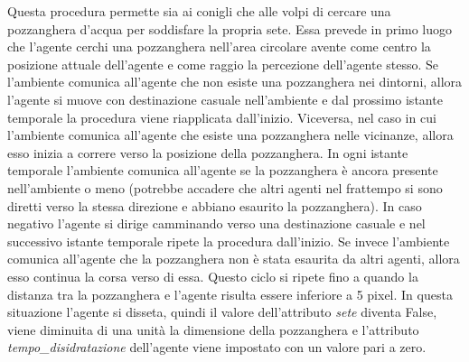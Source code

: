 \documentclass[11pt]{article}
\begin{document}
Questa procedura permette sia ai conigli che alle volpi di cercare una pozzanghera d'acqua per soddisfare la propria sete. Essa prevede in primo luogo che l'agente cerchi una pozzanghera nell'area circolare avente come centro la posizione attuale dell'agente e come raggio la percezione dell'agente stesso. Se l'ambiente comunica all'agente che non esiste una pozzanghera nei dintorni, allora l'agente si muove con destinazione casuale nell'ambiente e dal prossimo istante temporale la procedura viene riapplicata dall'inizio. Viceversa, nel caso in cui l'ambiente comunica all'agente che esiste una pozzanghera nelle vicinanze, allora esso inizia a correre verso la posizione della pozzanghera. In ogni istante temporale l'ambiente comunica all'agente se la pozzanghera è ancora presente nell'ambiente o meno (potrebbe accadere che altri agenti nel frattempo si sono diretti verso la stessa direzione e abbiano esaurito la pozzanghera). In caso negativo l'agente si dirige camminando verso una destinazione casuale e nel successivo istante temporale ripete la procedura dall'inizio. Se invece l'ambiente comunica all'agente che la pozzanghera non è stata esaurita da altri agenti, allora esso continua la corsa verso di essa. Questo ciclo si ripete fino a quando la distanza tra la pozzanghera e l'agente risulta essere inferiore a 5 pixel. In questa situazione l'agente si disseta, quindi il valore dell'attributo \emph{sete} diventa False, viene diminuita di una unità la dimensione della pozzanghera e l'attributo \emph{tempo\_disidratazione} dell'agente viene impostato con un valore pari a zero. 
\end{document}
